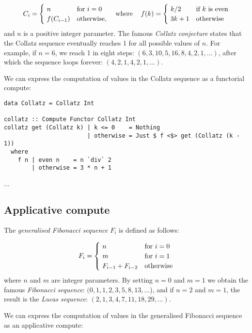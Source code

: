 \[
C_{i} = {\begin{cases}~n&{\text{for }}i=0\\~f(C_{i-1})&{\text{otherwise}},\end{cases}}\hspace{12pt}\text{where}\hspace{12pt}f(k)={\begin{cases}~k/2&{\text{if }}k\text{ is even}\\~3k+1&{\text{otherwise}}\end{cases}}
\vspace{2mm}
\]
\noindent
and $n$ is a positive integer parameter. The famous \emph{Collatz conjecture}
states that the Collatz sequence eventually reaches 1 for all possible values of
$n$. For example, if $n=6$, we reach 1 in eight steps:
$(6, 3, 10, 5, 16, 8, 4, 2, 1, \dots)$, after which the sequence loops forever:
$(4, 2, 1, 4, 2, 1, \dots)$.

We can express the computation of values in the Collatz sequence as a functorial
compute:

\begin{verbatim}
data Collatz = Collatz Int

collatz :: Compute Functor Collatz Int
collatz get (Collatz k) | k <= 0    = Nothing
                        | otherwise = Just $ f <$> get (Collatz (k - 1))
  where
    f n | even n    = n `div` 2
        | otherwise = 3 * n + 1
\end{verbatim}

...


\subsection{Applicative compute}\label{sec-compute-applicative}
The \emph{generalised Fibonacci sequence} $F_i$ is defined as follows:

\[
F_{i} = {\begin{cases}~n&{\text{for }}i=0\\~m&{\text{for }}i=1\\~F_{i-1}+F_{i-2}&{\text{otherwise}}\end{cases}}
\vspace{2mm}
\]
\noindent
where $n$ and $m$ are integer parameters. By setting $n=0$ and $m=1$ we obtain
the famous \emph{Fibonacci sequence}: $(0, 1, 1, 2, 3, 5, 8, 13, \dots$), and if
$n=2$ and $m=1$, the result is the \emph{Lucas sequence}:
$(2, 1, 3, 4, 7, 11, 18, 29, \dots)$.

We can express the computation of values in the generalised Fibonacci sequence
as an applicative compute:

